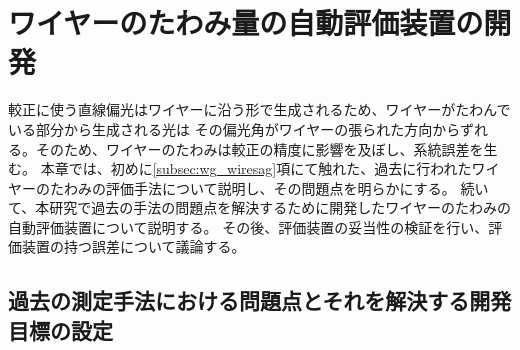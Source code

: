 \documentclass[../../main.tex]{subfiles}
\begin{document}
\chapter{ワイヤーのたわみ量の自動評価装置の開発}
\label{chap:wiresag}
較正に使う直線偏光はワイヤーに沿う形で生成されるため、ワイヤーがたわんでいる部分から生成される光は
その偏光角がワイヤーの張られた方向からずれる。そのため、ワイヤーのたわみは較正の精度に影響を及ぼし、系統誤差を生む。
本章では、初めに\ref{subsec:wg_wiresag}項にて触れた、過去に行われたワイヤーのたわみの評価手法について説明し、その問題点を明らかにする。
続いて、本研究で過去の手法の問題点を解決するために開発したワイヤーのたわみの自動評価装置について説明する。
その後、評価装置の妥当性の検証を行い、評価装置の持つ誤差について議論する。

\section{過去の測定手法における問題点とそれを解決する開発目標の設定}
\end{document}
